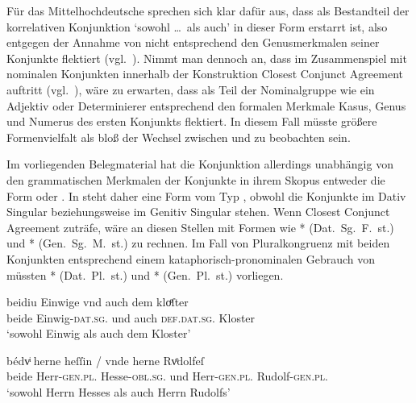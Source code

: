 Für das Mittelhochdeutsche sprechen sich
\citet[626--627]{ksw2} klar dafür aus, dass  als Bestandteil der
korrelativen Konjunktion  `sowohl \dots\ als auch' in
dieser Form erstarrt ist, also  entgegen der Annahme von
\citet{askedal1974} nicht entsprechend den Genusmerkmalen seiner Konjunkte
flektiert (vgl.~). Nimmt man dennoch an, dass im
Zusammenspiel mit nominalen Konjunkten innerhalb der Konstruktion Closest
Conjunct Agreement auftritt (vgl.~), wäre zu erwarten,
dass  als Teil der Nominalgruppe wie ein Adjektiv oder
Determinierer entsprechend den formalen Merkmale Kasus, Genus und Numerus des
ersten Konjunkts flektiert. In diesem Fall müsste größere Formenvielfalt als
bloß der Wechsel zwischen  und  zu beobachten sein.

Im vorliegenden Belegmaterial hat die Konjunktion allerdings unabhängig von den
grammatischen Merkmalen der Konjunkte in ihrem Skopus entweder die Form
 oder . In  steht daher eine
Form vom Typ , obwohl die Konjunkte im Dativ Singular
 beziehungsweise im Genitiv Singular
 stehen. Wenn Closest Conjunct Agreement zuträfe, wäre
an diesen Stellen mit Formen wie * (Dat.~Sg.~F.~st.) und
* (Gen.~Sg.~M.~st.) zu rechnen. Im Fall von Pluralkongruenz mit
beiden Konjunkten entsprechend einem kataphorisch-pronominalen Gebrauch von
 müssten * (Dat.\ Pl.\ st.) und *
(Gen.\ Pl.\ st.) vorliegen.

\begin{exe}
\ex \label{ex:caoconjbeide}
	\begin{xlist}
	\ex \label{ex:caoconjbeide_1}
		\gll beidiu Einwige vnd auch dem kloͤſter \\
				beide Einwig-\textsc{dat.sg.\FemF} und auch
				\textsc{def.dat.sg.\NeutM} Kloster \\
		\trans `sowohl Einwig als auch dem Kloster'
			\parencites(Nr.~2925, Landshut, 1298)[219,34]{cao4}

	\ex \label{ex:caoconjbeide_2}
		\gll bédvͥ herne heſſin / vnde herne Rvͦdolfeſ \\
			beide Herr-\textsc{gen.pl.\MascM} Hesse-\textsc{obl.sg.\MascM} {}
				und Herr-\textsc{gen.pl.\MascM} Rudolf-\textsc{gen.pl.\MascM}
				\\
		\trans `sowohl Herrn Hesses als auch Herrn Rudolfs'
			\parencites(Nr.~1318, Freiburg i.\,Br., 1290)[561,11--12]{cao2}
	\end{xlist}
\end{exe}

